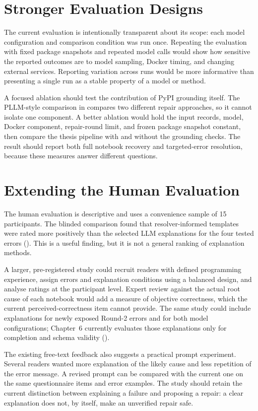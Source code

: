 \section{Stronger Evaluation Designs}
\label{sec:fw-evaluation}

The current evaluation is intentionally transparent about its scope: each model
configuration and comparison condition was run once. Repeating the evaluation
with fixed package snapshots and repeated model calls would show how sensitive
the reported outcomes are to model sampling, Docker timing, and changing
external services. Reporting variation across runs would be more informative
than presenting a single run as a stable property of a model or method.

A focused ablation should test the contribution of PyPI grounding itself. The
PLLM-style comparison in  compares two different
repair approaches, so it cannot isolate one component. A better ablation would
hold the input records, model, Docker component, repair-round limit, and frozen
package snapshot constant, then compare the thesis pipeline with and without
the grounding checks. The result should report both full notebook recovery and
targeted-error resolution, because these measures answer different questions.

\section{Extending the Human Evaluation}
\label{sec:fw-human}

The human evaluation is descriptive and uses a convenience sample of 15
participants. The blinded comparison found that resolver-informed templates
were rated more positively than the selected LLM explanations for the four
tested errors (). This is a useful finding,
but it is not a general ranking of explanation methods.

A larger, pre-registered study could recruit readers with defined programming
experience, assign errors and explanation conditions using a balanced design,
and analyse ratings at the participant level. Expert review against the actual
root cause of each notebook would add a measure of objective correctness,
which the current perceived-correctness item cannot provide. The same study
could include explanations for newly exposed Round-2 errors and for both model
configurations; Chapter~6 currently evaluates those explanations only for
completion and schema validity ().

The existing free-text feedback also suggests a practical prompt experiment.
Several readers wanted more explanation of the likely cause and less repetition
of the error message. A revised prompt can be compared with the current one on
the same questionnaire items and error examples. The study should retain the
current distinction between explaining a failure and proposing a repair: a clear
explanation does not, by itself, make an unverified repair safe.
